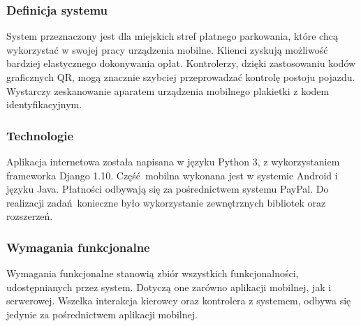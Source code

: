 \subsubsection*{Definicja systemu}

System przeznaczony jest dla miejskich stref płatnego parkowania, które chcą wykorzystać w swojej pracy urządzenia mobilne. Klienci zyskują możliwość bardziej elastycznego dokonywania opłat. Kontrolerzy, dzięki zastosowaniu kodów graficznych QR, mogą znacznie szybciej przeprowadzać kontrolę postoju pojazdu. Wystarczy zeskanowanie aparatem urządzenia mobilnego plakietki z kodem identyfikacyjnym. 

\subsubsection*{Technologie}

Aplikacja internetowa została napisana w języku Python 3, z wykorzystaniem frameworka Django 1.10. Część mobilna wykonana jest w systemie Android i języku Java. Płatności odbywają się za pośrednictwem systemu PayPal. Do realizacji zadań konieczne było wykorzystanie zewnętrznych bibliotek oraz rozszerzeń.

\subsubsection*{Wymagania funkcjonalne}

Wymagania funkcjonalne stanowią zbiór wszystkich funkcjonalności, udostępnianych przez system. Dotyczą one zarówno aplikacji mobilnej, jak i serwerowej. Wszelka interakcja kierowcy oraz kontrolera z systemem, odbywa się jedynie za pośrednictwem aplikacji mobilnej.

